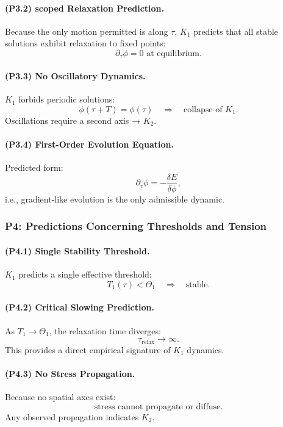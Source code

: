 \paragraph{(P3.2) scoped Relaxation Prediction.}
Because the only motion permitted is along $\tau$, $K_1$ predicts that
all stable solutions exhibit relaxation to fixed points:
\[
\partial_\tau \phi = 0 \text{ at equilibrium}.
\]

\paragraph{(P3.3) No Oscillatory Dynamics.}
$K_1$ forbids periodic solutions:
\[
\phi(\tau + T) = \phi(\tau)
\quad\Rightarrow\quad \text{collapse of } K_1.
\]
Oscillations require a second axis → $K_2$.

\paragraph{(P3.4) First-Order Evolution Equation.}
Predicted form:
\[
\partial_\tau \phi = -\frac{\delta E}{\delta\phi},
\]
i.e., gradient-like evolution is the only admissible dynamic.

\subsubsection{P4: Predictions Concerning Thresholds and Tension}

\paragraph{(P4.1) Single Stability Threshold.}
$K_1$ predicts a single effective threshold:
\[
T_1(\tau) < \Theta_1
\quad\Rightarrow\quad \text{stable}.
\]

\paragraph{(P4.2) Critical Slowing Prediction.}
As $T_1 \to \Theta_1$, the relaxation time diverges:
\[
\tau_{\mathrm{relax}} \to \infty.
\]
This provides a direct empirical signature of $K_1$ dynamics.

\paragraph{(P4.3) No Stress Propagation.}
Because no spatial axes exist:
\[
\text{stress cannot propagate or diffuse}.
\]
Any observed propagation indicates $K_2$.

